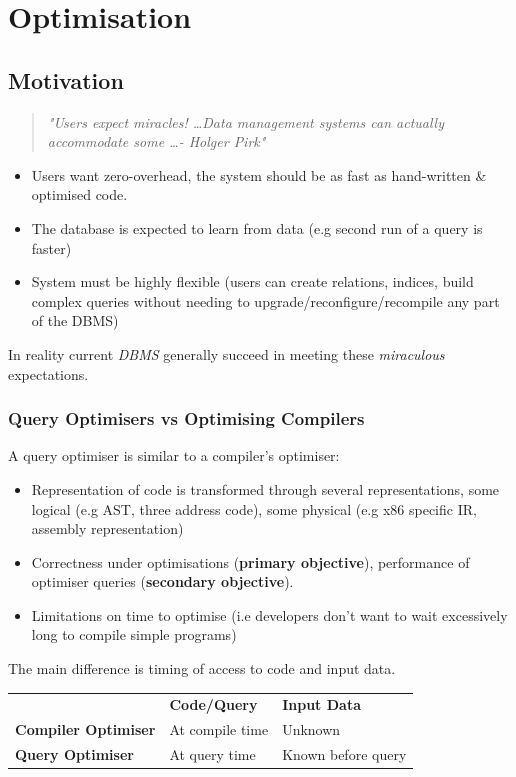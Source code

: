 \chapter{Optimisation}
\section{Motivation}
\begin{quote}
    \textit{"Users expect miracles! \dots Data management systems can actually accommodate some \dots - Holger Pirk"}
\end{quote}
\begin{itemize}
    \item Users want zero-overhead, the system should be as fast as hand-written \& optimised code.
    \item The database is expected to learn from data (e.g second run of a query is faster)
    \item System must be highly flexible (users can create relations, indices, build complex queries without needing to upgrade/reconfigure/recompile any part of the DBMS)
\end{itemize}
In reality current \textit{DBMS} generally succeed in meeting these \textit{miraculous} expectations.

\subsection{Query Optimisers vs Optimising Compilers}
A query optimiser is similar to a compiler's optimiser:
\begin{itemize}
    \item Representation of code is transformed through several representations, some logical (e.g AST, three address code), some physical (e.g x86 specific IR, assembly representation)
    \item Correctness under optimisations (\textbf{primary objective}), performance of optimiser queries (\textbf{secondary objective}).
    \item Limitations on time to optimise (i.e developers don't want to wait excessively long to compile simple programs)
\end{itemize}
The main difference is timing of access to code and input data.
\begin{center}
    \begin{tabular}{l l l}
                                    & \textbf{Code/Query} & \textbf{Input Data} \\
        \textbf{Compiler Optimiser} & At compile time     & Unknown             \\
        \textbf{Query Optimiser}    & At query time       & Known before query  \\
    \end{tabular}
\end{center}

